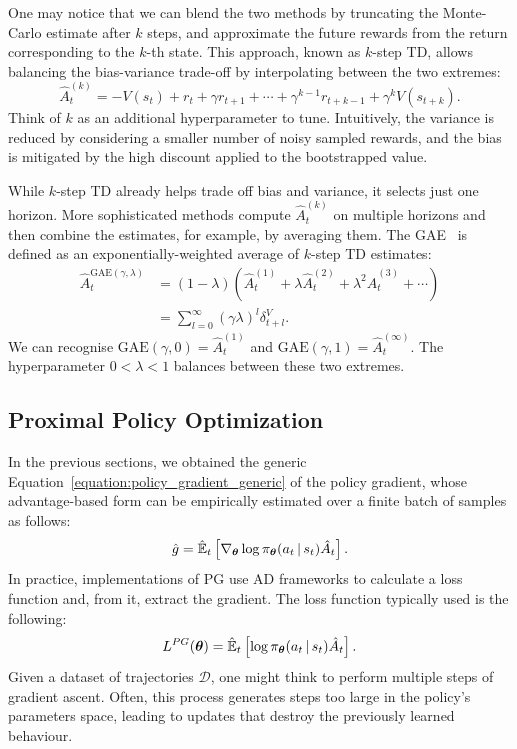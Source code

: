 One may notice that we can blend the two methods by truncating the Monte-Carlo estimate after $k$ steps, and approximate the future rewards from the return corresponding to the $k$-th state.
This approach, known as $k$-step TD, allows balancing the bias-variance trade-off by interpolating between the two extremes:
%
\begin{equation*}
    \hat{A}_t^{(k)} = -V(s_t) + r_t + \gamma r_{t+1} + \cdots + \gamma^{k-1} r_{t+k-1} + \gamma^k V(s_{t+k}) .
\end{equation*}
%
Think of $k$ as an additional hyperparameter to tune.
Intuitively, the variance is reduced by considering a smaller number of noisy sampled rewards, and the bias is mitigated by the high discount applied to the bootstrapped value.

While $k$-step TD already helps trade off bias and variance, it selects just one horizon.
More sophisticated methods compute $\hat{A}_t^{(k)}$ on multiple horizons and then combine the estimates, for example, by averaging them.
The \ac{GAE}~\parencite{schulman_high-dimensional_2018} is defined as an exponentially-weighted average of $k$-step TD estimates:
%
\begin{align*}
    \hat{A}_t^{\text{GAE}(\gamma, \lambda)} 
    &= (1 - \lambda) \left( \hat{A}_t^{(1)} + \lambda \hat{A}_t^{(2)} + \lambda^2 \hat{A}_t^{(3)} + \cdots \right) \\
    &= \sum_{l=0}^{\infty} (\gamma \lambda)^l \delta^V_{t+l}
    .
\end{align*}
%
We can recognise $\text{GAE}(\gamma, 0) = \hat{A}_t^{(1)}$ and $\text{GAE}(\gamma, 1) = \hat{A}_t^{(\infty)}$.
The hyperparameter $0 < \lambda < 1$ balances between these two extremes.

\subsection{Proximal Policy Optimization}
\label{sec:ppo}

In the previous sections, we obtained the generic Equation~\eqref{equation:policy_gradient_generic} of the policy gradient, whose advantage-based form can be empirically estimated over a finite batch of samples as follows:
%
\begin{equation*}
    \hat{g} = \hat{\operatorname*{\mathbb{E}}}_t \left[ \nabla_{\boldsymbol{\theta}} \log \pi_{\boldsymbol{\theta}}(a_t \operatorname{\mid} s_t) \hat{A}_t \right] .
\end{equation*}
%
In practice, implementations of \ac{PG} use \acl{AD} frameworks to calculate a loss function and, from it, extract the gradient.
The loss function typically used is the following:
%
\begin{equation}
    \label{equation:policy_gradient_loss_advantage}
    L^{PG}(\boldsymbol{\theta}) = \hat{\operatorname*{\mathbb{E}}}_t \left[ \log \pi_{\boldsymbol{\theta}}(a_t \operatorname{\mid} s_t) \hat{A}_t \right] .
\end{equation}
%
Given a dataset of trajectories $\mathcal{D}$, one might think to perform multiple steps of gradient ascent.
Often, this process generates steps too large in the policy's parameters space, leading to updates that destroy the previously learned behaviour.

